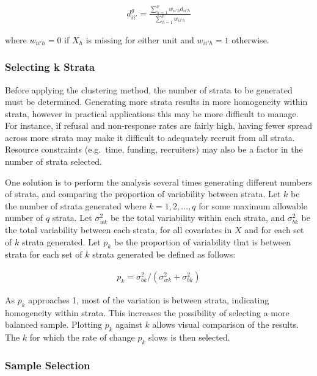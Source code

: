 \documentclass[man,floatsintext]{apa6}
\theoremstyle{definition}
\theoremstyle{definition}
\theoremstyle{definition}
\theoremstyle{remark}
\begin{document}
\begin{align}
  d^{g}_{ii'} = \frac{\sum^p_{h = 1}w_{ii'h}d_{ii'h}}{\sum^p_{h = 1}w_{ii'h}}
\end{align}

where \(w_{ii'h} = 0\) if \(X_h\) is missing for either unit and
\(w_{ii'h} = 1\) otherwise.

\hypertarget{selecting-k-strata}{%
\subsubsection{Selecting k Strata}\label{selecting-k-strata}}

Before applying the clustering method, the number of strata to be
generated must be determined. Generating more strata results in more
homogeneity within strata, however in practical applications this may be
more difficult to manage. For instance, if refusal and non-response
rates are fairly high, having fewer spread across more strata may make
it difficult to adequately recruit from all strata. Resource constraints
(e.g.~time, funding, recruiters) may also be a factor in the number of
strata selected.

One solution is to perform the analysis several times generating
different numbers of strata, and comparing the proportion of variability
between strata. Let \(k\) be the number of strata generated where
\(k = 1, 2, ..., q\) for some maximum allowable number of \(q\) strata.
Let \(\sigma_{wk}^2\) be the total variability within each strata, and
\(\sigma_{bk}^2\) be the total variability between each strata, for all
covariates in \(X\) and for each set of \(k\) strata generated. Let
\(p_k\) be the proportion of variability that is between strata for each
set of \(k\) strata generated be defined as follows:

\begin{align} \label{eq:pk}
  p_k = \sigma_{bk}^2/(\sigma_{wk}^2 + \sigma_{bk}^2)
\end{align}

As \(p_k\) approaches 1, most of the variation is between strata,
indicating homogeneity within strata. This increases the possibility of
selecting a more balanced sample. Plotting \(p_k\) against \(k\) allows
visual comparison of the results. The \(k\) for which the rate of change
\(p_k\) slows is then selected.

\hypertarget{sample-selection}{%
\subsubsection{Sample Selection}\label{sample-selection}}
\end{document}
